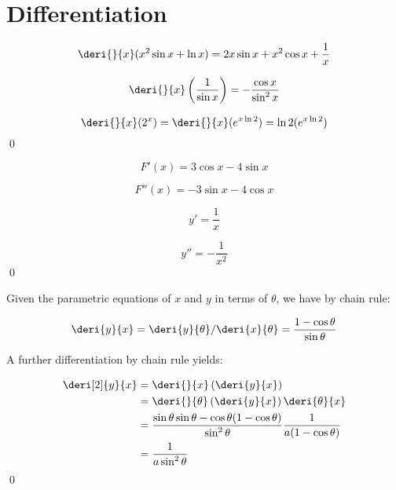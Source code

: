 \documentclass[12pt]{article}
\begin{document}



\pagebreak
\section*{Differentiation}



\begin{equation}
    \deri{}{x} (x^{2} \sin{x} + \ln{x}) = 2x \sin{x} + x^{2} \cos{x} + \frac{1}{x}
\end{equation}

\begin{equation}
    \deri{}{x} \left( \frac{1}{\sin{x}} \right) = -\frac{\cos{x}}{\sin^{2}{x}}
\end{equation}

\begin{equation}
    \deri{}{x} (2^{x}) = \deri{}{x} (e^{x\ln{2}}) = \ln{2} (e^{x\ln{2}})
\end{equation}
\qed



\begin{equation}
    F'(x) = 3\cos{x} - 4\sin{x}
\end{equation}

\begin{equation}
    F''(x) = -3\sin{x} - 4\cos{x}
\end{equation}

\begin{equation}
    y' = \frac{1}{x}
\end{equation}

\begin{equation}
    y'' = - \frac{1}{x^2}
\end{equation}
\qed


Given the parametric equations of $x$ and $y$ in terms of $\theta$, we have by chain rule:

\begin{equation}
    \deri{y}{x} = \deri{y}{\theta} / \deri{x}{\theta} = \frac{1 - \cos{\theta}}{\sin{\theta}}
\end{equation}

A further differentiation by chain rule yields:

\begin{equation}
    \begin{split}
        \deri[2]{y}{x} &= \deri{}{x} \left( \deri{y}{x} \right) \\
        &= \deri{}{\theta} \left( \deri{y}{x} \right) \deri{\theta}{x} \\
        &= \frac{\sin{\theta} \sin{\theta} - \cos{\theta}(1 - \cos{\theta})}{\sin^{2}{\theta}} \frac{1}{a(1 - \cos{\theta})} \\
        &= \frac{1}{a \sin^{2}{\theta}}
    \end{split}
\end{equation}
\qed
\end{document}
